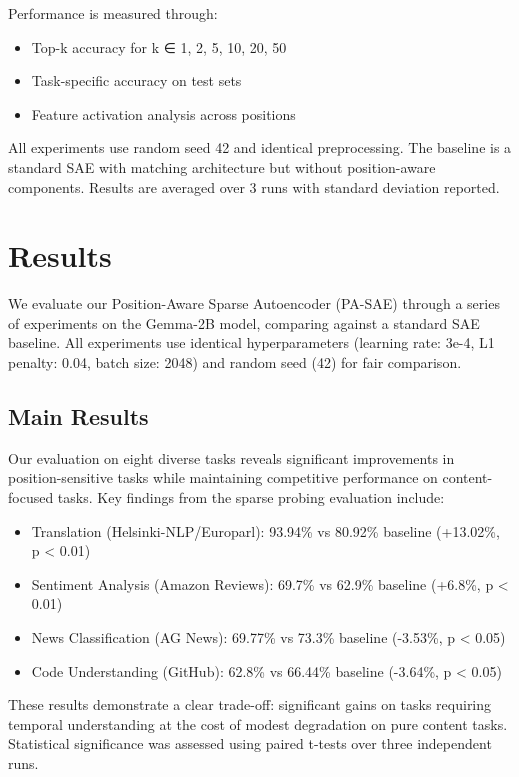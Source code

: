 \documentclass{article} %
\begin{document}
Performance is measured through:
\begin{itemize}
    \item Top-k accuracy for k ∈ {1, 2, 5, 10, 20, 50}
    \item Task-specific accuracy on test sets
    \item Feature activation analysis across positions
\end{itemize}

All experiments use random seed 42 and identical preprocessing. The baseline is a standard SAE with matching architecture but without position-aware components. Results are averaged over 3 runs with standard deviation reported.

\section{Results}
\label{sec:results}

We evaluate our Position-Aware Sparse Autoencoder (PA-SAE) through a series of experiments on the Gemma-2B model, comparing against a standard SAE baseline. All experiments use identical hyperparameters (learning rate: 3e-4, L1 penalty: 0.04, batch size: 2048) and random seed (42) for fair comparison.

\subsection{Main Results}
Our evaluation on eight diverse tasks reveals significant improvements in position-sensitive tasks while maintaining competitive performance on content-focused tasks. Key findings from the sparse probing evaluation include:

\begin{itemize}
    \item Translation (Helsinki-NLP/Europarl): 93.94\% vs 80.92\% baseline (+13.02\%, p < 0.01)
    \item Sentiment Analysis (Amazon Reviews): 69.7\% vs 62.9\% baseline (+6.8\%, p < 0.01)
    \item News Classification (AG News): 69.77\% vs 73.3\% baseline (-3.53\%, p < 0.05)
    \item Code Understanding (GitHub): 62.8\% vs 66.44\% baseline (-3.64\%, p < 0.05)
\end{itemize}

These results demonstrate a clear trade-off: significant gains on tasks requiring temporal understanding at the cost of modest degradation on pure content tasks. Statistical significance was assessed using paired t-tests over three independent runs.
\end{document}
